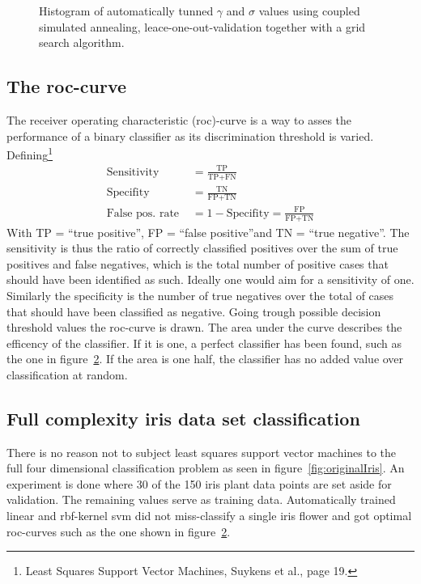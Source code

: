 \begin{figure}
\centering


\caption{Histogram of automatically tunned  $\gamma$ and $\sigma$ values using coupled simulated annealing, leace-one-out-validation together with a grid search algorithm.}
\label{fig:tuneCsaGridLeave}
\end{figure}

\subsection{The roc-curve}
The receiver operating characteristic (roc)-curve is a way to asses the performance of a binary classifier as its discrimination threshold is varied. Defining\footnote{Least Squares Support Vector Machines, Suykens et al., page 19.}
\begin{align}
\text{Sensitivity } &= \frac{\text{TP}}{\text{TP} + \text{FN}} \\ 
\text{Specifity } &= \frac{\text{TN}}{\text{FP} + \text{TN}} \\
\text{False pos. rate } &= 1 - \text{Specifity} = \frac{\text{FP}}{\text{FP} + \text{TN}}
\end{align}
With TP = \textquotedblleft true positive\textquotedblright,
 FP = \textquotedblleft false positive\textquotedblright and
 TN = \textquotedblleft true negative\textquotedblright. The sensitivity is thus the ratio of correctly classified positives over the sum of true positives and false negatives, which is the total number of positive cases that should have been identified as such. Ideally one would aim for a sensitivity of one. Similarly the specificity is the number of true negatives over the total of cases that should have been classified as negative.
Going trough possible decision threshold values the roc-curve is drawn. The area under the curve describes the efficency of the classifier. If it is one, a perfect classifier has been found, such as the one in figure~\ref{fig:roc}. If the area is one half, the classifier has no added value over classification at random.  
 

\begin{figure}
\centering

\caption{}
\label{fig:roc}
\end{figure}


\subsection{Full complexity iris data set classification}
There is no reason not to subject least squares support vector machines to the full four dimensional classification problem as seen in figure~\ref{fig:originalIris}. An experiment is done where 30 of the 150 iris plant data points are set aside for validation. The remaining values serve as training data. Automatically trained linear and rbf-kernel svm did not miss-classify a single iris flower and got optimal roc-curves such as the one shown in figure~\ref{fig:roc}.